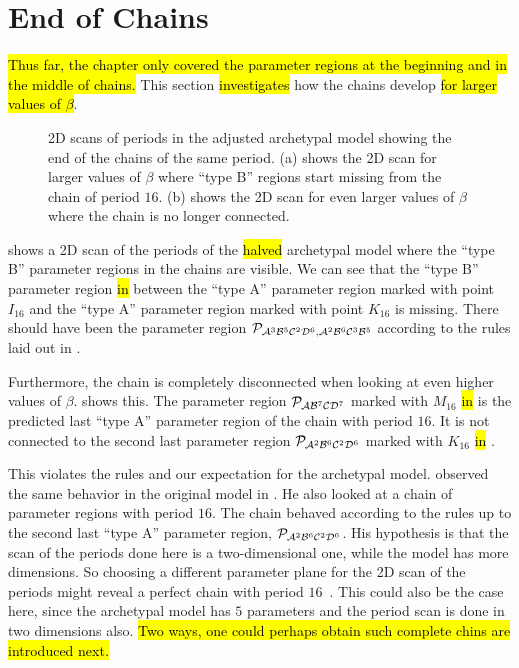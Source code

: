 \section{End of Chains}
\label{sec:arch.end}

\hl{Thus far, the chapter only covered the parameter regions at the beginning and in the middle of chains.}
This section \hl{investigates} how the chains develop \hl{for larger values of $\beta$}.

\begin{figure}
	\centering
	\caption[2D scans of periods in the archetypal model showing the end of the chains]{
		2D scans of periods in the adjusted archetypal model showing the end of the chains of the same period.
		(a) shows the 2D scan for larger values of $\beta$ where ``type B'' regions start missing from the chain of period $16$.
		(b) shows the 2D scan for even larger values of $\beta$ where the chain is no longer connected.
	}
\end{figure}

 shows a 2D scan of the periods of the \hl{halved} archetypal model where the ``type B'' parameter regions in the chains are visible.
We can see that the ``type B'' parameter region \hl{in}  between the ``type A'' parameter region marked with point $I_{16}$ and the ``type A'' parameter region marked with point $K_{16}$ is missing.
There should have been the parameter region $\mathcal{P}_{\mathcal{A}^3\mathcal{B}^5\mathcal{C}^2\mathcal{D}^6, \mathcal{A}^2\mathcal{B}^6\mathcal{C}^3\mathcal{B}^5}$ according to the rules laid out in .

Furthermore, the chain is completely disconnected when looking at even higher values of $\beta$.
 shows this.
The parameter region $\mathcal{P}_{\mathcal{A}\mathcal{B}^7\mathcal{C}\mathcal{D}^7}$ marked with $M_{16}$ \hl{in}  is the predicted last ``type A'' parameter region of the chain with period $16$.
It is not connected to the second last parameter region $\mathcal{P}_{\mathcal{A}^2\mathcal{B}^6\mathcal{C}^2\mathcal{D}^6}$ marked with $K_{16}$ \hl{in} .

This violates the rules and our expectation for the archetypal model.
 observed the same behavior in the original model in \cite{akyuz2022}.
He also looked at a chain of parameter regions with period $16$.
The chain behaved according to the rules up to the second last ``type A'' parameter region, $\mathcal{P}_{\mathcal{A}^2\mathcal{B}^6\mathcal{C}^2\mathcal{D}^6}$.
His hypothesis is that the scan of the periods done here is a two-dimensional one, while the model has more dimensions.
So choosing a different parameter plane for the 2D scan of the periods might reveal a perfect chain with period $16$~\cite{akyuz2022}.
This could also be the case here, since the archetypal model has $5$ parameters and the period scan is done in two dimensions also.
\hl{
	Two ways, one could perhaps obtain such complete chins are introduced next.
}

